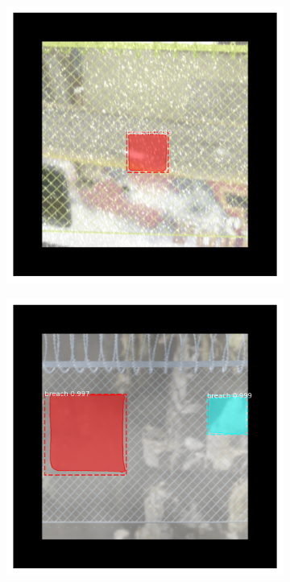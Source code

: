 \documentclass[../Head/Main.tex]{subfiles}
\begin{document}
\begin{figure}[H]
\begin{subfigure}{.23\textwidth}
        \caption{}
    \end{subfigure}
    \hfill
    \begin{subfigure}{.23\textwidth}
        \centering
        \includegraphics[width=\textwidth]{../Figures/rcnn_results/found_breaches/mask/6.png}
        \caption{}
    \end{subfigure}
    \hfill
    \begin{subfigure}{.23\textwidth}
        \centering
        \includegraphics[width=\textwidth]{../Figures/rcnn_results/found_breaches/mask/7.png}

\end{subfigure}
\end{figure}
\end{document}
